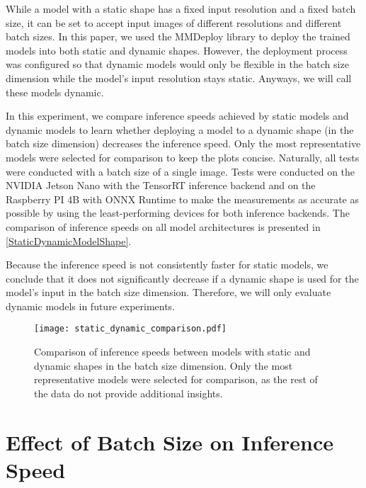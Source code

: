 While a model with a static shape has a fixed input resolution and a
fixed batch size, it can be set to accept input images of different resolutions
and different batch sizes. In this paper, we used the MMDeploy library to deploy
the trained models into both static and dynamic shapes. However, the deployment
process was configured so that dynamic models would only be flexible in the
batch size dimension while the model's input resolution stays static. Anyways, we
will call these models dynamic.

In this experiment, we compare inference speeds achieved by static models and
dynamic models to learn whether deploying a model to a dynamic shape (in the
batch size dimension) decreases the inference speed. Only the most
representative models were selected for comparison to keep the plots concise.
Naturally, all tests were conducted with a batch size of a single image. Tests
were conducted on the NVIDIA Jetson Nano with the TensorRT inference backend and
on the Raspberry PI 4B with ONNX Runtime to make the measurements as accurate as
possible by using the least-performing devices for both inference backends. The
comparison of inference speeds on all model architectures is presented in
\autoref{StaticDynamicModelShape}.

Because the inference speed is not consistently faster for static models, we
conclude that it does not significantly decrease if a dynamic shape is used for
the model's input in the batch size dimension. Therefore, we will only evaluate
dynamic models in future experiments.

\begin{figure}[h]
    \begin{framed}
        \centering
        \texttt{[image: static\_dynamic\_comparison.pdf]}
        \caption{Comparison of inference speeds between models with static and
        dynamic shapes in the batch size dimension. Only the most representative
        models were selected for comparison, as the rest of the data do not
        provide additional insights.}
        \label{StaticDynamicModelShape}
    \end{framed}
\end{figure}







\section{Effect of Batch Size on Inference Speed}
\label{BatchSizeComparisonSection}

